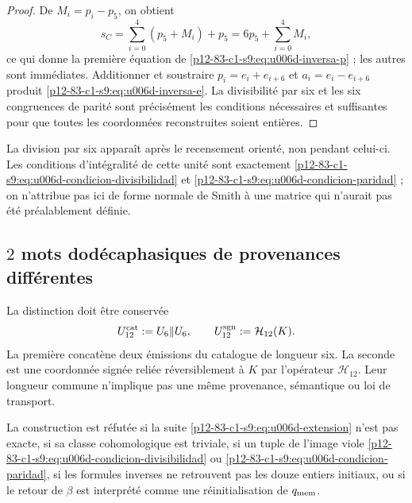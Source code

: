 {\begin{proof}
De \(M_i=p_i-p_5\), on obtient
\[
 s_C=\sum_{i=0}^{4}(p_5+M_i)+p_5
 =6p_5+\sum_{i=0}^{4}M_i,
\]
ce qui donne la première équation de \eqref{p12-83-c1-s9:eq:u006d-inversa-p} ; les autres sont
immédiates. Additionner et soustraire
\(p_i=e_i+e_{i+6}\) et \(a_i=e_i-e_{i+6}\) produit
\eqref{p12-83-c1-s9:eq:u006d-inversa-e}. La divisibilité par six et les six
congruences de parité sont précisément les conditions nécessaires et
suffisantes pour que toutes les coordonnées reconstruites soient entières.
\end{proof}

La division par six apparaît après le recensement orienté, non pendant celui-ci. Les
conditions d’intégralité de cette unité sont exactement
\eqref{p12-83-c1-s9:eq:u006d-condicion-divisibilidad} et
\eqref{p12-83-c1-s9:eq:u006d-condicion-paridad} ; on n’attribue pas ici de forme normale de
Smith à une matrice qui n’aurait pas été préalablement définie.

\subsection{\(2\) mots dodécaphasiques de provenances différentes}

La distinction doit être conservée
\begin{equation}
 U_{12}^{\rm cat}:=U_6\Vert U_6,
 \qquad
 U_{12}^{\rm sgn}:=\mathcal H_{12}(K).
 \label{p12-83-c1-s9:eq:u006d-dos-palabras-doce}
\end{equation}
La première concatène deux émissions du catalogue de longueur six. La seconde
est une coordonnée signée reliée réversiblement à \(K\) par l’opérateur
\(\mathcal H_{12}\). Leur longueur commune n’implique pas une même provenance,
sémantique ou loi de transport.

\begin{criterion}
\label{p12-83-c1-s9:crit:u006d-refutacion}
La construction est réfutée si la suite
\eqref{p12-83-c1-s9:eq:u006d-extension} n’est pas exacte, si sa classe cohomologique est
triviale, si un tuple de l’image viole
\eqref{p12-83-c1-s9:eq:u006d-condicion-divisibilidad} ou
\eqref{p12-83-c1-s9:eq:u006d-condicion-paridad}, si les formules inverses ne retrouvent pas
les douze entiers initiaux, ou si le retour de \(\beta\) est interprété comme
une réinitialisation de \(q_{\rm mem}\).
\end{criterion}



}
